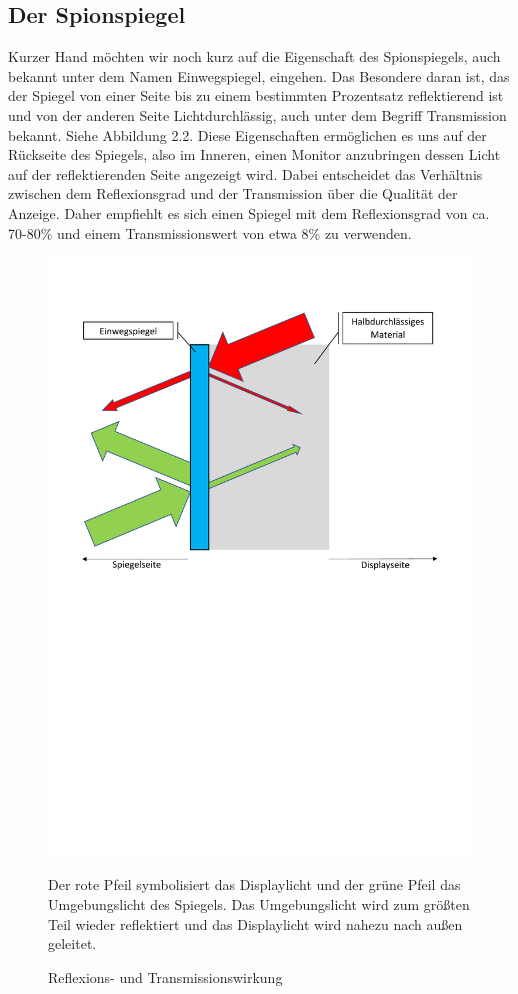 \subsection{Der Spionspiegel}
Kurzer Hand möchten wir noch kurz auf die Eigenschaft des Spionspiegels, auch bekannt unter dem Namen Einwegspiegel, eingehen. Das Besondere daran ist, das der Spiegel von einer Seite bis zu einem bestimmten Prozentsatz reflektierend ist und von der anderen Seite Lichtdurchlässig, auch unter dem Begriff Transmission bekannt. Siehe Abbildung 2.2. Diese Eigenschaften ermöglichen es uns auf der Rückseite des Spiegels, also im Inneren, einen Monitor anzubringen dessen Licht auf der reflektierenden Seite angezeigt wird. Dabei entscheidet das Verhältnis zwischen dem Reflexionsgrad und der Transmission über die Qualität der Anzeige. Daher empfiehlt es sich einen Spiegel mit dem Reflexionsgrad von ca. 70-80\% und einem Transmissionswert von etwa 8\% zu verwenden. 
\begin{figure}[H]
	\includegraphics[trim=30mm 140mm 30mm 30mm, scale=0.5]{bilder/Einwegspiegel.pdf}\\
	\caption{Reflexions- und Transmissionswirkung}
	{\scriptsize Der rote Pfeil symbolisiert das Displaylicht und der grüne Pfeil das Umgebungslicht des Spiegels. Das Umgebungslicht wird zum größten Teil wieder reflektiert und das Displaylicht wird nahezu nach außen geleitet. }
\end{figure}

